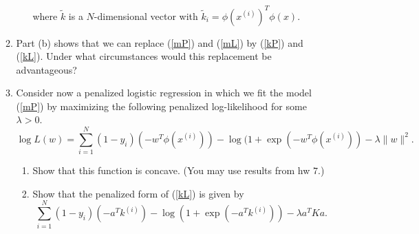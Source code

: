 \documentclass[11pt]{article}
\begin{document}
\begin{enumerate}
\begin{enumerate}
\begin{enumerate}
where $\tilde{k}$ is a $N$-dimensional vector with $\tilde{k}_i = \phi(x^{(i)})^T \phi(x)$.  
\end{enumerate}
\item Part (b) shows that we can replace (\ref{mP}) and (\ref{mL}) by (\ref{kP}) and (\ref{kL}).  Under what circumstances would this replacement be advantageous?
\item Consider now a penalized logistic regression in which we fit the model (\ref{mP}) by maximizing the following penalized log-likelihood for some $\lambda > 0$.
\begin{equation}  \label{mpenalty}
\log L(w) = \sum_{i=1}^N (1-y_i)(-w^T\phi(x^{(i)})) - \log(1 + \exp(-w^T\phi(x^{(i)})) - \lambda \|w\|^2.
\end{equation}
\begin{enumerate}
\item Show that this function is concave.  (You may use results from hw $7$.)
\item Show that the penalized form of (\ref{kL}) is given by
\begin{equation} \label{kpenalty}
 \sum_{i=1}^N (1-y_i)(-a^T k^{(i)}) - \log(1 + \exp(-a^T k^{(i)})) - \lambda a^T K a.
\end{equation}
\end{enumerate}
\end{enumerate}


\end{enumerate}
\end{document}
